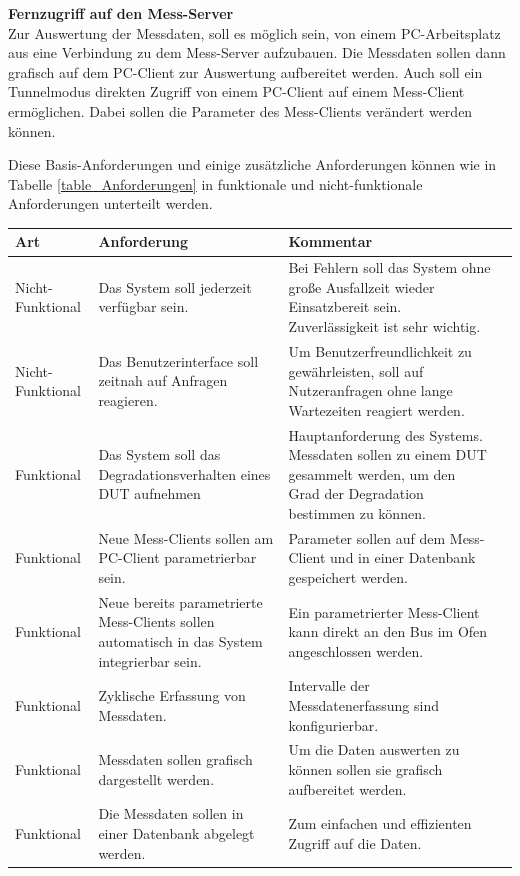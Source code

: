 \textbf{Fernzugriff auf den Mess-Server}\\
Zur Auswertung der Messdaten, soll es möglich sein, von einem PC-Arbeitsplatz aus eine Verbindung zu dem Mess-Server aufzubauen. Die Messdaten sollen dann grafisch auf dem PC-Client zur Auswertung aufbereitet werden.
Auch soll ein Tunnelmodus direkten Zugriff von einem PC-Client auf einem Mess-Client ermöglichen. Dabei sollen die Parameter des Mess-Clients verändert werden können.


Diese Basis-Anforderungen und einige zusätzliche Anforderungen können wie in Tabelle \ref{table_Anforderungen} in funktionale und nicht-funktionale Anforderungen unterteilt werden.


\begin{table}[H]
\begin{center}
\begin{tabularx}{\textwidth}{|p{3cm}|X|X|X|}\hline
Art & Anforderung & Kommentar \\ \hline
Nicht-Funktional & Das System soll jederzeit verfügbar sein. & Bei Fehlern soll das System ohne große Ausfallzeit wieder Einsatzbereit sein. Zuverlässigkeit ist sehr wichtig.\\ \hline
Nicht-Funktional & Das Benutzerinterface soll zeitnah auf Anfragen reagieren. & Um Benutzerfreundlichkeit zu gewährleisten, soll auf Nutzeranfragen ohne lange Wartezeiten reagiert werden. \\ \hline
Funktional & Das System soll das Degradationsverhalten eines \ac{DUT} aufnehmen & Hauptanforderung des Systems. Messdaten sollen zu einem \ac{DUT} gesammelt werden, um den Grad der Degradation bestimmen zu können. \\ \hline
Funktional & Neue Mess-Clients sollen am PC-Client parametrierbar sein. & Parameter sollen auf dem Mess-Client und in einer Datenbank gespeichert werden. \\ \hline
Funktional & Neue bereits parametrierte Mess-Clients sollen automatisch in das System integrierbar sein. & Ein parametrierter Mess-Client kann direkt an den Bus im Ofen angeschlossen werden.\\ \hline
Funktional & Zyklische Erfassung von Messdaten. & Intervalle der Messdatenerfassung sind konfigurierbar.\\ \hline
Funktional & Messdaten sollen grafisch dargestellt werden. & Um die Daten auswerten zu können sollen sie grafisch aufbereitet werden.\\ \hline
Funktional & Die Messdaten sollen in einer Datenbank abgelegt werden. & Zum einfachen und effizienten Zugriff auf die Daten.\\ \hline

\end{tabularx}
\end{center}
\end{table}
